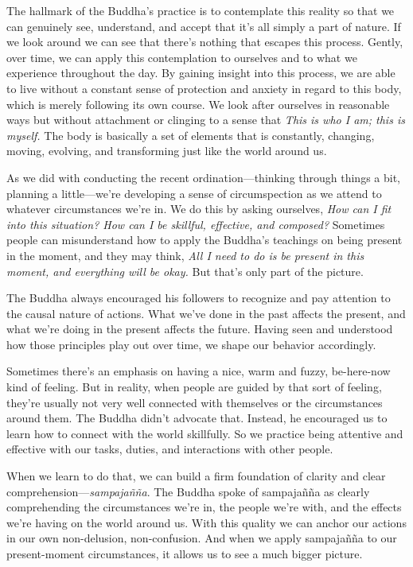 The hallmark of the Buddha's practice is to contemplate this reality so 
that we can genuinely see, understand, and accept that it's all simply 
a part of nature. If we look around we can see that there's nothing 
that escapes this process. Gently, over time, we can apply this 
contemplation to ourselves and to what we experience throughout the 
day. By gaining insight into this process, we are able to live without 
a constant sense of protection and anxiety in regard to this body, 
which is merely following its own course. We look after ourselves in 
reasonable ways but without attachment or clinging to a sense that 
\emph{This is who I am; this is myself.} The body is basically a set of 
elements that is constantly, changing, moving, evolving, and 
transforming just like the world around us.


As we did with conducting the recent ordination---thinking through 
things a bit, planning a little---we're developing a sense of 
circumspection as we attend to whatever circumstances we're in. We do 
this by asking ourselves, \emph{How can I fit into this situation? How 
can I be skillful, effective, and composed?} Sometimes people can 
misunderstand how to apply the Buddha's teachings on being present in 
the moment, and they may think, \emph{All I need to do is be present in 
this moment, and everything will be okay.} But that's only part of the 
picture.

The Buddha always encouraged his followers to recognize and pay 
attention to the causal nature of actions. What we've done in the past 
affects the present, and what we're doing in the present affects the 
future. Having seen and understood how those principles play out over 
time, we shape our behavior accordingly.

Sometimes there's an emphasis on having a nice, warm and fuzzy, 
be-here-now kind of feeling. But in reality, when people are guided by 
that sort of feeling, they're usually not very well connected with 
themselves or the circumstances around them. The Buddha didn't advocate 
that. Instead, he encouraged us to learn how to connect with the world 
skillfully. So we practice being attentive and effective with our 
tasks, duties, and interactions with other people.

When we learn to do that, we can build a firm foundation of clarity and 
clear comprehension---\emph{sampajañña}. The Buddha spoke of 
sampajañña as clearly comprehending the circumstances we're in, the 
people we're with, and the effects we're having on the world around us. 
With this quality we can anchor our actions in our own non-delusion, 
non-confusion. And when we apply sampajañña to our present-moment 
circumstances, it allows us to see a much bigger picture.

